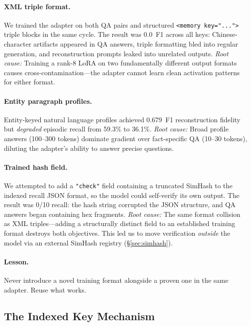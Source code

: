 \documentclass[11pt]{article}
\begin{document}
\paragraph{XML triple format.}
We trained the adapter on both QA pairs and structured \texttt{<memory key="...">} triple blocks in the same cycle.
The result was 0.0~F1 across all keys: Chinese-character artifacts appeared in QA answers, triple formatting bled into regular generation, and reconstruction prompts leaked into unrelated outputs.
\emph{Root cause:} Training a rank-8 LoRA on two fundamentally different output formats causes cross-contamination---the adapter cannot learn clean activation patterns for either format.

\paragraph{Entity paragraph profiles.}
Entity-keyed natural language profiles achieved 0.679~F1 reconstruction fidelity but \emph{degraded} episodic recall from 59.3\% to 36.1\%.
\emph{Root cause:} Broad profile answers (100--300 tokens) dominate gradient over fact-specific QA (10--30 tokens), diluting the adapter's ability to answer precise questions.

\paragraph{Trained hash field.}
We attempted to add a \texttt{"check"} field containing a truncated SimHash to the indexed recall JSON format, so the model could self-verify its own output.
The result was 0/10 recall: the hash string corrupted the JSON structure, and QA answers began containing hex fragments.
\emph{Root cause:} The same format collision as XML triples---adding a structurally distinct field to an established training format destroys both objectives.
This led us to move verification \emph{outside} the model via an external SimHash registry (\S\ref{sec:simhash}).

\paragraph{Lesson.}
Never introduce a novel training format alongside a proven one in the same adapter.
Reuse what works.

\subsection{The Indexed Key Mechanism}
\label{sec:mechanism}
\end{document}
